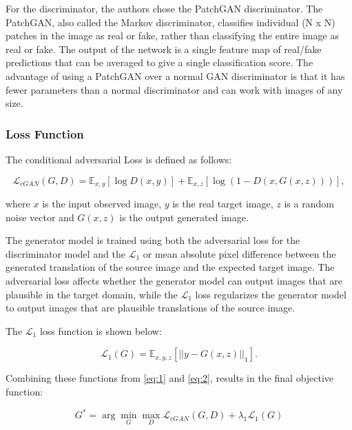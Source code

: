 For the discriminator, the authors chose the PatchGAN discriminator. The PatchGAN, also called the Markov discriminator, classifies individual (N x N) patches in the image as real or fake, rather than classifying the entire image as real or fake. The output of the network is a single feature map of real/fake predictions that can be averaged to give a single classification score. The advantage of using a PatchGAN over a normal \ac{GAN} discriminator is that it has fewer parameters than a normal discriminator and can work with images of any size.

\subsubsection*{Loss Function}

The conditional adversarial Loss is defined as follows:

\begin{equation}
    \mathcal{L}_{cGAN}(G,D) = \mathbb{E}_{x,y} [\log{D(x,y)}] + \mathbb{E}_{x,z} [\log{(1-D(x,G(x,z)))}],
    \label{eq:1}
\end{equation}

where $x$ is the input observed image, $y$ is the real target image, $z$ is a random noise vector and $G(x,z)$ is the output generated image.

The generator model is trained using both the adversarial loss for the discriminator model and the $\mathcal{L}_{1}$ or mean absolute pixel difference between the generated translation of the source image and the expected target image. The adversarial loss affects whether the generator model can output images that are plausible in the target domain, while the $\mathcal{L}_{1}$ loss regularizes the generator model to output images that are plausible translations of the source image.

The $\mathcal{L}_{1}$ loss function is shown below:

\begin{equation}
    \mathcal{L}_{1}(G) = \mathbb{E}_{x,y,z} [||y-G(x,z)||_1].
    \label{eq:2}
\end{equation}

Combining these functions from \ref{eq:1} and \ref{eq:2}, results in the final objective function:

\begin{equation}
    G^* = \arg \min_{G}\max_{D} \mathcal{L}_{cGAN}(G,D) + \lambda_1  \mathcal{L}_{1}(G)
\end{equation}


